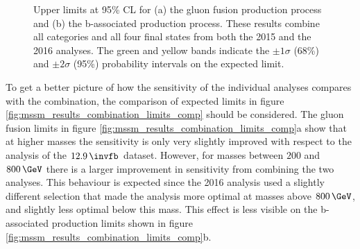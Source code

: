 \begin{figure}[h!]
\begin{center}
\end{center}
\caption[Upper limits at 95\% CL for the gluon fusion and b-associated production
process, obtained by combining all channels and categories of the 2015 nd the 2016 analyses.] {Upper limits at 95\% \ac{CL} for (a) the gluon fusion production
process and (b) the b-associated production process. These results
combine all categories and all four final states from both the 2015
and the 2016 analyses. The green and yellow bands indicate
the $\pm 1\sigma$ (68\%) and $\pm 2\sigma$ (95\%) probability intervals on the expected limit.}
\label{fig:mssm_results_combination_limits}
\end{figure}

To get a better picture of how the sensitivity of the individual analyses compares
with the combination, the comparison 
of expected limits in figure \ref{fig:mssm_results_combination_limits_comp} should be considered. The
gluon fusion limits in figure \ref{fig:mssm_results_combination_limits_comp}a show that at
higher masses the sensitivity is only very slightly improved with respect to the 
analysis of the $12.9\,\invfb$ dataset. However, for masses between $200$ and $800\,\GeV$
there is a larger improvement in sensitivity from combining the two analyses.
This behaviour is expected since the 2016 analysis used a slightly different
selection that made the analysis more optimal at masses above $800\,\GeV$,
and slightly less optimal below this mass. This
effect is less visible on the b-associated production limits shown in figure \ref{fig:mssm_results_combination_limits_comp}b.

